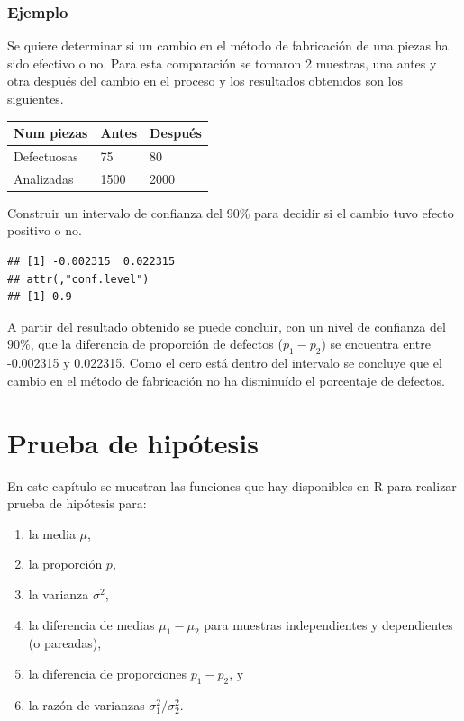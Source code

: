 \documentclass[10pt,]{krantz}
\makeatletter
\newenvironment{Shaded}{\begin{snugshade}}{\end{snugshade}}
\newcommand{\KeywordTok}[1]{\textcolor[rgb]{0.13,0.29,0.53}{\textbf{#1}}}
\newcommand{\DataTypeTok}[1]{\textcolor[rgb]{0.13,0.29,0.53}{#1}}
\newcommand{\DecValTok}[1]{\textcolor[rgb]{0.00,0.00,0.81}{#1}}
\newcommand{\FloatTok}[1]{\textcolor[rgb]{0.00,0.00,0.81}{#1}}
\newcommand{\OperatorTok}[1]{\textcolor[rgb]{0.81,0.36,0.00}{\textbf{#1}}}
\newcommand{\NormalTok}[1]{#1}
\providecommand{\tightlist}{%
  \setlength{\itemsep}{0pt}\setlength{\parskip}{0pt}}
\newenvironment{kframe}{%
\medskip{}
\setlength{\fboxsep}{.8em}
 \def\at@end@of@kframe{}%
 \ifinner\ifhmode%
  \def\at@end@of@kframe{\end{minipage}}%
  \begin{minipage}{\columnwidth}%
 \fi\fi%
 \def\FrameCommand##1{\hskip\@totalleftmargin \hskip-\fboxsep
 \colorbox{shadecolor}{##1}\hskip-\fboxsep
     \hskip-\linewidth \hskip-\@totalleftmargin \hskip\columnwidth}%
 \MakeFramed {\advance\hsize-\width
   \@totalleftmargin\z@ \linewidth\hsize
   \@setminipage}}%
 {\par\unskip\endMakeFramed%
 \at@end@of@kframe}
\renewenvironment{Shaded}{\begin{kframe}}{\end{kframe}}
\makeatother
\begin{document}
\subsection*{Ejemplo}\label{ejemplo-62}


Se quiere determinar si un cambio en el método de fabricación de una
piezas ha sido efectivo o no. Para esta comparación se tomaron 2
muestras, una antes y otra después del cambio en el proceso y los
resultados obtenidos son los siguientes.

\begin{longtable}[]{@{}lll@{}}
\toprule
Num piezas & Antes & Después\tabularnewline
\midrule
\endhead
Defectuosas & 75 & 80\tabularnewline
Analizadas & 1500 & 2000\tabularnewline
\bottomrule
\end{longtable}

Construir un intervalo de confianza del 90\% para decidir si el cambio
tuvo efecto positivo o no.

\begin{Shaded}
\end{Shaded}

\begin{verbatim}
## [1] -0.002315  0.022315
## attr(,"conf.level")
## [1] 0.9
\end{verbatim}

A partir del resultado obtenido se puede concluir, con un nivel de
confianza del \(90\%\), que la diferencia de proporción de defectos
(\(p_1 - p_2\)) se encuentra entre -0.002315 y 0.022315. Como el cero
está dentro del intervalo se concluye que el cambio en el método de
fabricación no ha disminuído el porcentaje de defectos.

\chapter{Prueba de hipótesis}\label{ph}

En este capítulo se muestran las funciones que hay disponibles en R para
realizar prueba de hipótesis para:

\begin{enumerate}
\def\labelenumi{\arabic{enumi}.}
\tightlist
\item
  la media \(\mu\),
\item
  la proporción \(p\),
\item
  la varianza \(\sigma^2\),
\item
  la diferencia de medias \(\mu_1-\mu_2\) para muestras independientes y
  dependientes (o pareadas),
\item
  la diferencia de proporciones \(p_1 - p_2\), y
\item
  la razón de varianzas \(\sigma_1^2 / \sigma_2^2\).
\end{enumerate}
\end{document}
